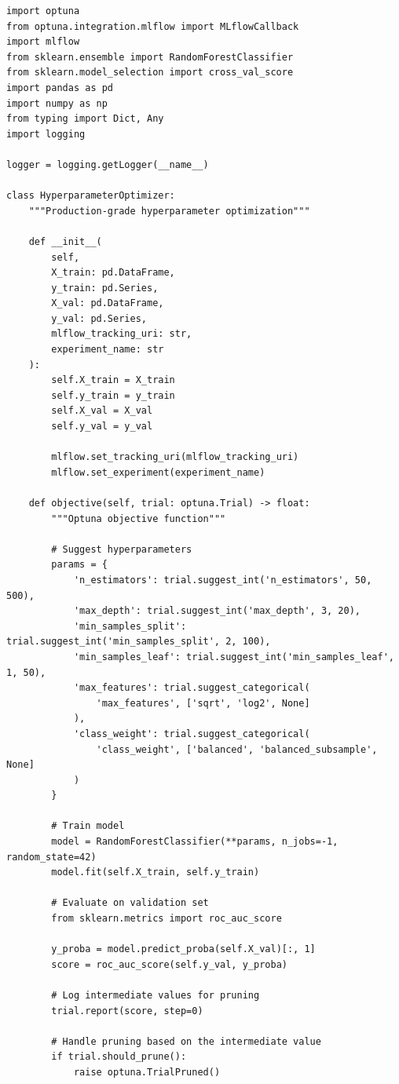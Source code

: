 \begin{lstlisting}[style=python, caption=Hyperparameter Optimization with Optuna]
import optuna
from optuna.integration.mlflow import MLflowCallback
import mlflow
from sklearn.ensemble import RandomForestClassifier
from sklearn.model_selection import cross_val_score
import pandas as pd
import numpy as np
from typing import Dict, Any
import logging

logger = logging.getLogger(__name__)

class HyperparameterOptimizer:
    """Production-grade hyperparameter optimization"""

    def __init__(
        self,
        X_train: pd.DataFrame,
        y_train: pd.Series,
        X_val: pd.DataFrame,
        y_val: pd.Series,
        mlflow_tracking_uri: str,
        experiment_name: str
    ):
        self.X_train = X_train
        self.y_train = y_train
        self.X_val = X_val
        self.y_val = y_val

        mlflow.set_tracking_uri(mlflow_tracking_uri)
        mlflow.set_experiment(experiment_name)

    def objective(self, trial: optuna.Trial) -> float:
        """Optuna objective function"""

        # Suggest hyperparameters
        params = {
            'n_estimators': trial.suggest_int('n_estimators', 50, 500),
            'max_depth': trial.suggest_int('max_depth', 3, 20),
            'min_samples_split': trial.suggest_int('min_samples_split', 2, 100),
            'min_samples_leaf': trial.suggest_int('min_samples_leaf', 1, 50),
            'max_features': trial.suggest_categorical(
                'max_features', ['sqrt', 'log2', None]
            ),
            'class_weight': trial.suggest_categorical(
                'class_weight', ['balanced', 'balanced_subsample', None]
            )
        }

        # Train model
        model = RandomForestClassifier(**params, n_jobs=-1, random_state=42)
        model.fit(self.X_train, self.y_train)

        # Evaluate on validation set
        from sklearn.metrics import roc_auc_score

        y_proba = model.predict_proba(self.X_val)[:, 1]
        score = roc_auc_score(self.y_val, y_proba)

        # Log intermediate values for pruning
        trial.report(score, step=0)

        # Handle pruning based on the intermediate value
        if trial.should_prune():
            raise optuna.TrialPruned()


\end{lstlisting}
